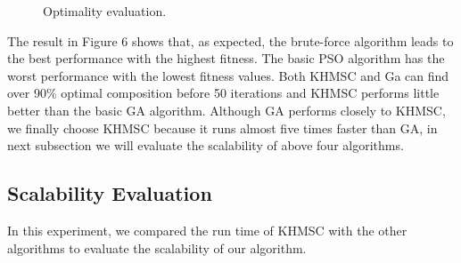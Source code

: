 \documentclass[10pt,journal,compsoc]{IEEEtran}
\begin{document}
\begin{figure}[!t]
\centering
{}
\hfil
{}
\hfil
{}

\caption{Optimality evaluation.} \label{fig_sim}
\end{figure}




The result in Figure 6 shows that, as expected, the brute-force algorithm leads to the best performance with the highest fitness. The basic PSO algorithm has the worst performance with the lowest fitness values. Both KHMSC and Ga can find over 90\% optimal composition before 50 iterations and KHMSC performs little better than the basic GA algorithm. Although GA performs closely to KHMSC, we finally choose KHMSC because it runs almost five times faster than GA, in next subsection we will evaluate the scalability of above four algorithms.

\subsection{Scalability Evaluation}
In this experiment, we compared the run time of KHMSC with the other algorithms to evaluate the scalability of our algorithm.
\end{document}
